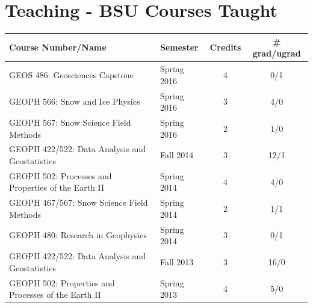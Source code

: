 \documentclass[11pt]{article}
\renewcommand\arraystretch{1}
\begin{document}
\begin{table}[!htbp]
\section*{Teaching - BSU Courses Taught}
\renewcommand\arraystretch{0.7}
  \centering
  \begin{tabular}{|l|l|c|c|}
\hline
\textbf{Course Number/Name} & \textbf{Semester} & \textbf{Credits} & \textbf{\# grad/ugrad} \\ \hline \hline

GEOS 486: Geosciences Capstone & Spring 2016 & 4 & 0/1 \\ \hline
GEOPH 566: Snow and Ice Physics & Spring 2016 & 3 & 4/0 \\ \hline
GEOPH 567: Snow Science Field Methods & Spring 2016 & 2 & 1/0 \\ \hline
GEOPH 422/522: Data Analysis and Geostatistics & Fall 2014 & 3 & 12/1 \\ \hline
GEOPH 502: Processes and Properties of the Earth II & Spring 2014 & 4 & 4/0 \\ \hline
GEOPH 467/567: Snow Science Field Methods & Spring 2014 & 2 & 1/1 \\ \hline
GEOPH 480: Research in Geophysics & Spring 2014 & 3 & 0/1 \\ \hline
GEOPH 422/522: Data Analysis and Geostatistics & Fall 2013 & 3 & 16/0 \\ \hline
GEOPH 502: Properties and Processes of the Earth II & Spring 2013 & 4 & 5/0 \\ \hline

\end{tabular}
\end{table}
\end{document}
